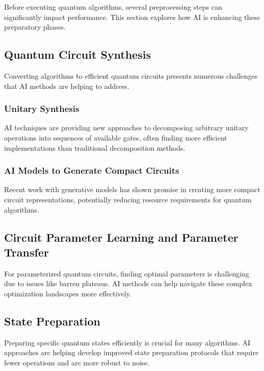 Before executing quantum algorithms, several preprocessing steps can significantly impact performance. This section explores how AI is enhancing these preparatory phases.

\subsection{Quantum Circuit Synthesis}
Converting algorithms to efficient quantum circuits presents numerous challenges that AI methods are helping to address.

\subsubsection{Unitary Synthesis}
AI techniques are providing new approaches to decomposing arbitrary unitary operations into sequences of available gates, often finding more efficient implementations than traditional decomposition methods.

\subsubsection{AI Models to Generate Compact Circuits}
Recent work with generative models has shown promise in creating more compact circuit representations, potentially reducing resource requirements for quantum algorithms.

\subsection{Circuit Parameter Learning and Parameter Transfer}
For parameterized quantum circuits, finding optimal parameters is challenging due to issues like barren plateaus. AI methods can help navigate these complex optimization landscapes more effectively.

\subsection{State Preparation}
Preparing specific quantum states efficiently is crucial for many algorithms. AI approaches are helping develop improved state preparation protocols that require fewer operations and are more robust to noise. 